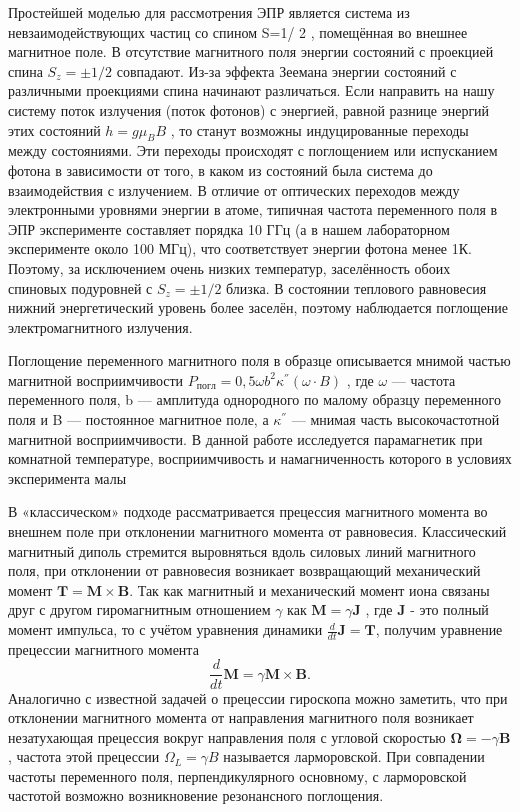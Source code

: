 \documentclass[a4paper, 12pt]{article}%
\begin{document}
	Простейшей моделью для рассмотрения ЭПР является система из невзаимодействующих
	частиц со спином S=1/ 2 , помещённая во внешнее магнитное поле. В отсутствие
	магнитного поля энергии состояний с проекцией спина $S_z=\pm1/2$ совпадают. Из-за
	эффекта Зеемана энергии состояний с различными проекциями спина начинают различаться. Если направить на нашу систему поток излучения (поток фотонов) с энергией,
	равной разнице энергий этих состояний $h = g \mu_{B} B  $ , то станут возможны индуцированные
	переходы между состояниями. Эти переходы происходят с поглощением или
	испусканием фотона в зависимости от того, в каком из состояний была система до
	взаимодействия с излучением. В отличие от оптических переходов между электронными
	уровнями энергии в атоме, типичная частота переменного поля в ЭПР эксперименте
	составляет порядка 10 ГГц (а в нашем лабораторном эксперименте около 100 МГц), что
	соответствует энергии фотона менее 1К. Поэтому, за исключением очень низких температур,
	заселённость обоих спиновых подуровней с  $S_z=\pm1/2$ близка. В состоянии теплового
	равновесия нижний энергетический уровень более заселён, поэтому наблюдается
	поглощение электромагнитного излучения. 
	
	
	Поглощение переменного магнитного поля в образце описывается мнимой частью магнитной
	восприимчивости $P_{погл} = 0,5 \omega b^2\kappa^{''}(\omega\cdot B)$ , где $\omega$ — частота переменного поля, b —
	амплитуда однородного по малому образцу переменного поля и B — постоянное
	магнитное поле, а $\kappa^{''}$ — мнимая часть высокочастотной магнитной восприимчивости.
	В
	данной работе исследуется парамагнетик при комнатной температуре, восприимчивость и
	намагниченность которого в условиях эксперимента малы
	
	
	В «классическом» подходе рассматривается прецессия магнитного момента во внешнем поле при отклонении магнитного момента от равновесия. Классический магнитный диполь стремится выровняться вдоль силовых линий магнитного поля, при отклонении от равновесия возникает возвращающий механический момент $\mathbf{T} = \mathbf{M}\times \mathbf{B}$. Так как магнитный и механический момент иона связаны друг с другом гиромагнитным отношением $\gamma$ как $\mathbf{M}=\gamma \mathbf{J}$ , где $\mathbf{J}$ - это полный момент импульса, то с учётом уравнения динамики
	$\frac{d}{dt}\mathbf{J} = \mathbf{T}$, получим уравнение прецессии магнитного момента
	\[\dfrac{d}{dt}\mathbf{M} = \gamma \mathbf{M} \times \mathbf{B}.\] 
	Аналогично
	с известной задачей о прецессии гироскопа можно заметить, что при отклонении магнитного момента от направления магнитного поля возникает незатухающая прецессия вокруг направления поля с угловой скоростью $\boldsymbol{\Omega} = -\gamma \mathbf{B}$, частота этой прецессии $\Omega_L = \gamma B$ называется ларморовской. При совпадении частоты переменного поля, перпендикулярного основному, с ларморовской частотой возможно возникновение резонансного поглощения.\\
	
\end{document}
